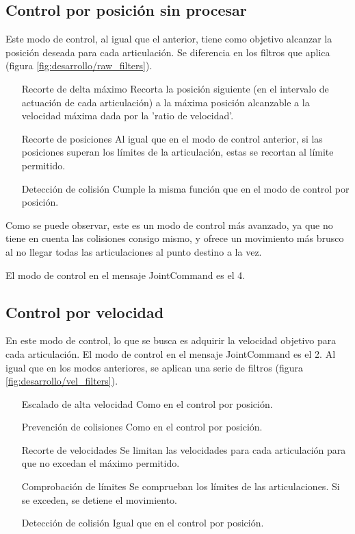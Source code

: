 \subsection{Control por posición sin procesar}
Este modo de control, al igual que el anterior, tiene como objetivo alcanzar la posición deseada para cada articulación. Se diferencia en los filtros que aplica (figura \ref{fig:desarrollo/raw_filters}).

\begin{enumerate}
\item [Recorte de delta máximo] Recorta la posición siguiente (en el intervalo de actuación de cada articulación) a la máxima posición alcanzable a la velocidad máxima dada por la 'ratio de velocidad'.
\item [Recorte de posiciones] Al igual que en el modo de control anterior, si las posiciones superan los límites de la articulación, estas se recortan al límite permitido.
\item [Detección de colisión] Cumple la misma función que en el modo de control por posición.
\end{enumerate}

Como se puede observar, este es un modo de control más avanzado, ya que no tiene en cuenta las colisiones consigo mismo, y ofrece un movimiento más brusco al no llegar todas las articulaciones al punto destino a la vez.

El modo de control en el mensaje JointCommand es el 4.

\subsection{Control por velocidad}
En este modo de control, lo que se busca es adquirir la velocidad objetivo para cada articulación. El modo de control en el mensaje JointCommand es el 2. Al igual que en los modos anteriores, se aplican una serie de filtros (figura \ref{fig:desarrollo/vel_filters}).

\begin{enumerate}
\item [Escalado de alta velocidad] Como en el control por posición.
\item [Prevención de colisiones] Como en el control por posición.
\item [Recorte de velocidades] Se limitan las velocidades para cada articulación para que no excedan el máximo permitido.
\item [Comprobación de límites] Se comprueban los límites de las articulaciones. Si se exceden, se detiene el movimiento.
\item [Detección de colisión] Igual que en el control por posición.
\end{enumerate}

